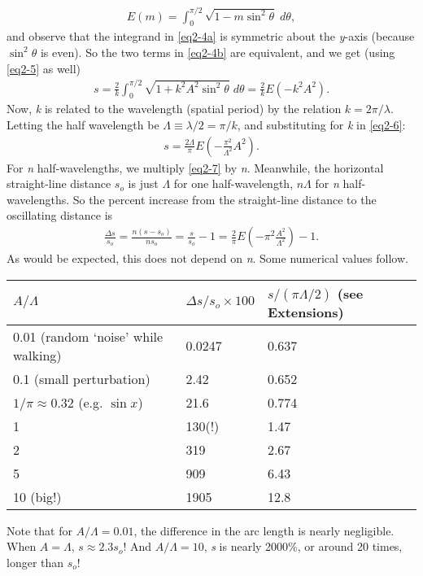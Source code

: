 \documentclass[11pt]{article}
\begin{document}
\begin{align}
E(m) = \int_{0}^{\pi/2} \sqrt{1-m \sin^2 \theta} \; d\theta, \label{eq2-5}
\end{align}
and observe that the integrand in \eqref{eq2-4a} is symmetric about the \textit{y}-axis (because $\sin^2\theta$ is even). So the two terms in \eqref{eq2-4b} are equivalent, and we get (using \eqref{eq2-5} as well)
\begin{align}
s = \frac{2}{k} \int_{0}^{\pi/2} \sqrt{1+ k^2 A^2 \sin^2 \theta} \; d\theta = \frac{2}{k} E\left(-k^2 A^2\right). \label{eq2-6}
\end{align}
Now, \textit{k} is related to the wavelength (spatial period) by the relation $k = 2\pi / \lambda$. Letting the half wavelength be $\Lambda \equiv \lambda / 2 = \pi / k$, and substituting for \textit{k} in \eqref{eq2-6}:
\begin{align} \label{eq2-7}
s = \frac{2 \Lambda}{\pi} E\left(-\frac{\pi^2}{\Lambda^2} A^2 \right).
\end{align}
For \textit{n} half-wavelengths, we multiply \eqref{eq2-7} by \textit{n}. Meanwhile, the horizontal straight-line distance $s_o$ is just $\Lambda$ for one half-wavelength, $n \Lambda$ for \textit{n} half-wavelengths. So the percent increase from the straight-line distance to the oscillating distance is
\begin{align} \label{eq2-8}
\frac{\Delta s}{s_o} = \frac{n(s - s_o)}{ns_o} = \frac{s}{s_o} - 1 = \boxed{\frac{2}{\pi} E\left(-\pi^2 \frac{A^2}{\Lambda^2}\right) - 1}. 
\end{align}
As would be expected, this does not depend on \textit{n}. Some numerical values follow.
\begin{center}
\begin{tabular}{l|l|l}
$A/\Lambda$ & $\Delta s / s_o \times 100$ & $s / (\pi \Lambda /2)$ (see Extensions)\\ \hline
0.01 (random `noise' while walking) & 0.0247 & 0.637 \\ 
0.1 (small perturbation) & 2.42 & 0.652 \\ 
$1/\pi \approx 0.32$ (e.g. $\sin x$) & 21.6 & 0.774 \\ 
1 & 130(!) & 1.47 \\ 
2 & 319 & 2.67 \\ 
5 & 909 & 6.43 \\ 
10 (big!) & 1905 & 12.8 \\ \hline
\end{tabular}
\end{center}
Note that for $A/\Lambda = 0.01$, the difference in the arc length is nearly negligible. When $A = \Lambda$, $s \approx 2.3s_o$! And $A/\Lambda = 10$, \textit{s} is nearly 2000\%, or around 20 times, longer than $s_o$!
\end{document}
